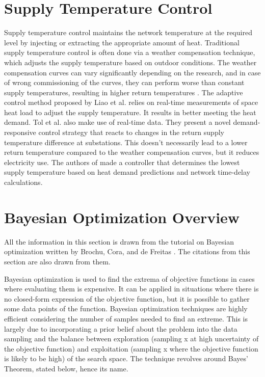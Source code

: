 \section{Supply Temperature Control}
Supply temperature control maintains the network temperature at the required level by injecting or extracting the appropriate amount of heat. Traditional supply temperature control is often done via a weather compensation technique, which adjusts the supply temperature based on outdoor conditions. The weather compensation curves can vary significantly depending on the research, and in case of wrong commissioning of the curves, they can perform worse than constant supply temperatures, resulting in higher return temperatures \cite{app15062982, LIAO200555}. The adaptive control method proposed by Liao et al. \cite{LIAO200555} relies on real-time measurements of space heat load to adjust the supply temperature. It results in better meeting the heat demand. Tol et al. \cite{TOL2021105} also make use of real-time data. They present a novel demand-responsive control strategy that reacts to changes in the return supply temperature difference at substations. This doesn't necessarily lead to a lower return temperature compared to the weather compensation curves, but it reduces electricity use. The authors of \cite{papaKonstantikou} made a controller that determines the lowest supply temperature based on heat demand predictions and network time-delay calculations. 


\section{Bayesian Optimization Overview}
All the information in this section is drawn from the tutorial on Bayesian optimization written by Brochu, Cora, and de Freitas \cite{bo_tutorial}. The citations from this section are also drawn from them. 

Bayesian optimization is used to find the extrema of objective functions in cases where evaluating them is expensive. It can be applied in situations where there is no closed-form expression of the objective function, but it is possible to gather some data points of the function. Bayesian optimization techniques are highly efficient considering the number of samples needed to find an extreme. This is largely due to incorporating a prior belief about the problem into the data sampling and the balance between exploration (sampling x at high uncertainty of the objective function) and exploitation (sampling x where the objective function is likely to be high) of the search space. The technique revolves around Bayes' Theorem, stated below, hence its name. 

